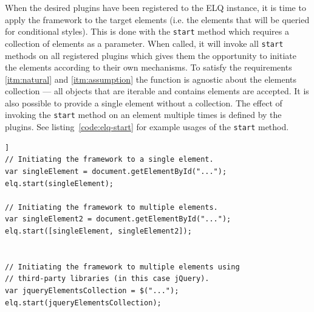 \documentclass[a4paper,11pt]{kth-mag}
\newcommand{\code}[1]{\texttt{#1}}
\newcommand\abbr[2][]{\uppercase{#2}\ifthenelse{\equal{#1}{}}%
                     {}{#1}}
\begin{document}
          When the desired plugins have been registered to the \abbr{elq} instance, it is time to apply the framework to the target \glspl{element} (i.e. the elements that will be queried for conditional styles).
          This is done with the \code{start} method which requires a collection of \glspl{element} as a parameter.
          When called, it will invoke all \code{start} methods on all registered plugins which gives them the opportunity to initiate the \glspl{element} according to their own mechanisms.
          To satisfy the requirements \ref{itm:natural} and \ref{itm:assumption} the function is agnostic about the \glspl{element} collection --- all objects that are iterable and contains \glspl{element} are accepted.
          It is also possible to provide a single \gls{element} without a collection.
          The effect of invoking the \code{start} method on an element multiple times is defined by the plugins.
          See listing~\ref{code:elq-start} for example usages of the \code{start} method.
          \begin{lstlisting}[caption={Example usages of the \code{start} method. The method only requires an iterable collection, so it is library agnostic.},captionpos=b,label={code:elq-start}]]
// Initiating the framework to a single element.
var singleElement = document.getElementById("...");
elq.start(singleElement);

// Initiating the framework to multiple elements.
var singleElement2 = document.getElementById("...");
elq.start([singleElement, singleElement2]);


// Initiating the framework to multiple elements using
// third-party libraries (in this case jQuery).
var jqueryElementsCollection = $("...");
elq.start(jqueryElementsCollection);
          \end{lstlisting}
\end{document}
